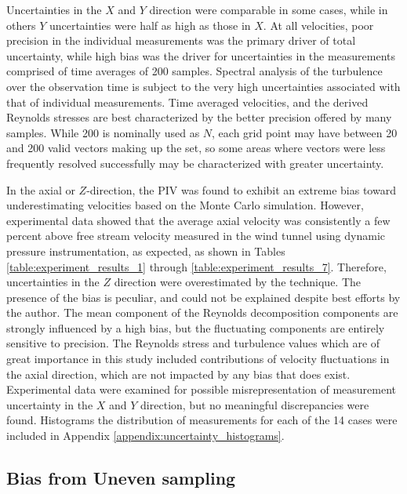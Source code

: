 \vspace{32pt}



Uncertainties in 
the $X$ and $Y$ direction were comparable in some cases, while in others $Y$ 
uncertainties were half as high as those in $X$. At all velocities, poor 
precision in the individual measurements was the primary driver of total 
uncertainty, while high bias was the driver for uncertainties in the 
measurements comprised of time averages of 200 samples. Spectral analysis of 
the turbulence over the observation time is subject to the very high 
uncertainties associated with that of individual measurements. Time averaged 
velocities, and the derived Reynolds stresses are best characterized by the 
better precision offered by many samples. While 200 is nominally used as $N$, 
each grid point may have between 20 and 200 valid vectors making up the set, so 
some areas where vectors were less frequently resolved successfully may be 
characterized with greater uncertainty.

In the axial or $Z$-direction, the PIV was found to exhibit an extreme bias 
toward underestimating velocities based on the Monte Carlo simulation.  
However, experimental data 
showed that the average axial velocity was consistently a few percent above 
free stream velocity measured in the wind tunnel using dynamic pressure 
instrumentation, as expected, as shown in Tables 
\ref{table:experiment_results_1} through \ref{table:experiment_results_7}. 
Therefore, uncertainties in the $Z$ direction were overestimated by the 
technique. The presence of the bias is peculiar, and could not be explained 
despite best efforts by the author. The mean component of the Reynolds 
decomposition components are 
strongly influenced by a high bias, but the fluctuating components are entirely 
sensitive to precision. The Reynolds stress and turbulence values which are of 
great importance in this study included contributions of velocity fluctuations 
in the axial direction, which are not impacted by any bias that does exist. 
Experimental data were examined for possible misrepresentation of measurement 
uncertainty in the $X$ and $Y$ direction, but no meaningful 
discrepancies were found. Histograms the distribution of measurements for each 
of the 14 cases were included in Appendix \ref{appendix:uncertainty_histograms}.


\subsection{Bias from Uneven sampling}


